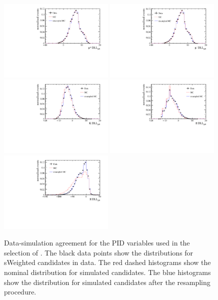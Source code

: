 \begin{figure}[!tb]
 \centering
 \includegraphics[width=0.49\textwidth]{figs/kpimm/data-mc/resampling/Muplus_PIDmu.pdf}
 \includegraphics[width=0.49\textwidth]{figs/kpimm/data-mc/resampling/Muminus_PIDmu.pdf}
 \includegraphics[width=0.49\textwidth]{figs/kpimm/data-mc/resampling/K_PIDmu.pdf}
 \includegraphics[width=0.49\textwidth]{figs/kpimm/data-mc/resampling/Pi_PIDmu.pdf}
 \includegraphics[width=0.49\textwidth]{figs/kpimm/data-mc/resampling/Pi_PIDp.pdf}
 \caption{Data-simulation agreement for the PID variables used in the selection of \BdToKpimm. The black data points show the distributions for sWeighted \BdToJPsiKst candidates in data. The red dashed histograms show the nominal distribution for simulated \BdToJPsiKst candidates. The blue histograms show the distribution for simulated \BdToJPsiKst candidates after the resampling procedure.}
\label{fig:kpimm:data-mc:pid}
\end{figure}